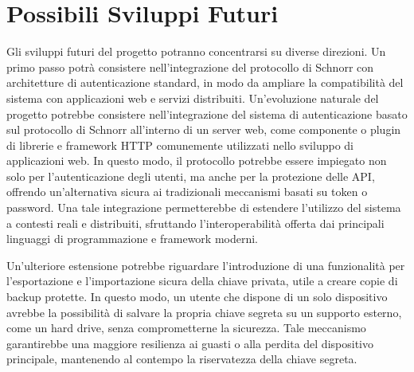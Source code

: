 \section{Possibili Sviluppi Futuri}

Gli sviluppi futuri del progetto potranno concentrarsi su diverse direzioni. Un primo passo potrà consistere nell'integrazione del protocollo di Schnorr con architetture di autenticazione standard, in modo da ampliare la compatibilità del sistema con applicazioni web e servizi distribuiti.
Un'evoluzione naturale del progetto potrebbe consistere nell'integrazione del sistema di autenticazione basato sul protocollo di Schnorr all'interno di un server web, come componente o plugin di librerie e framework HTTP comunemente utilizzati nello sviluppo di applicazioni web. In questo modo, il protocollo potrebbe essere impiegato non solo per l'autenticazione degli utenti, ma anche per la protezione delle API, offrendo un'alternativa sicura ai tradizionali meccanismi basati su token o password. Una tale integrazione permetterebbe di estendere l'utilizzo del sistema a contesti reali e distribuiti, sfruttando l'interoperabilità offerta dai principali linguaggi di programmazione e framework moderni.

Un'ulteriore estensione potrebbe riguardare l'introduzione di una funzionalità per l'esportazione e l'importazione sicura della chiave privata, utile a creare copie di backup protette.
In questo modo, un utente che dispone di un solo dispositivo avrebbe la possibilità di salvare la propria chiave segreta su un supporto esterno, come un hard drive, senza comprometterne la sicurezza.
Tale meccanismo garantirebbe una maggiore resilienza ai guasti o alla perdita del dispositivo principale, mantenendo al contempo la riservatezza della chiave segreta.
